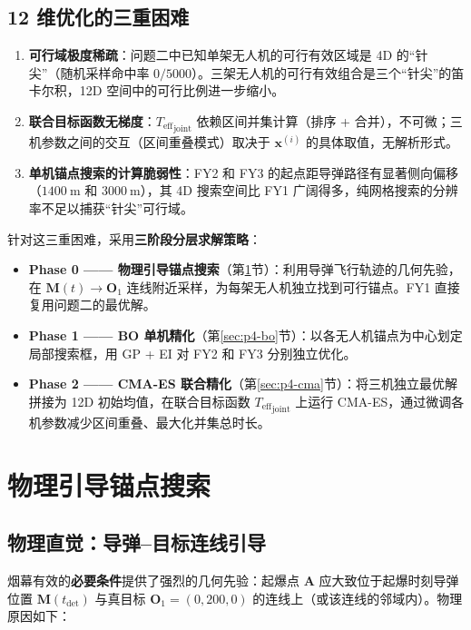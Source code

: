 \documentclass[12pt,a4paper]{ctexart}
\newcommand{\tdet}{t_{\text{det}}}
\newcommand{\Teff}{T_{\text{eff}}}
\begin{document}
\subsection{12 维优化的三重困难}

\begin{enumerate}[label=(\arabic*), leftmargin=*]
    \item \textbf{可行域极度稀疏}：问题二中已知单架无人机的可行有效区域是 4D 的``针尖''（随机采样命中率 $0/5000$）。三架无人机的可行有效组合是三个``针尖''的笛卡尔积，12D 空间中的可行比例进一步缩小。
    \item \textbf{联合目标函数无梯度}：${\Teff}_{\text{joint}}$ 依赖区间并集计算（排序 + 合并），不可微；三机参数之间的交互（区间重叠模式）取决于 $\mathbf{x}^{(i)}$ 的具体取值，无解析形式。
    \item \textbf{单机锚点搜索的计算脆弱性}：FY2 和 FY3 的起点距导弹路径有显著侧向偏移（$1400\ \mathrm{m}$ 和 $3000\ \mathrm{m}$），其 4D 搜索空间比 FY1 广阔得多，纯网格搜索的分辨率不足以捕获``针尖''可行域。
\end{enumerate}

针对这三重困难，采用\textbf{三阶段分层求解策略}：

\begin{itemize}
    \item \textbf{Phase 0 —— 物理引导锚点搜索}（第\ref{sec:p4-anchor}节）：利用导弹飞行轨迹的几何先验，在 $\mathbf{M}(t) \to \mathbf{O}_1$ 连线附近采样，为每架无人机独立找到可行锚点。FY1 直接复用问题二的最优解。
    \item \textbf{Phase 1 —— BO 单机精化}（第\ref{sec:p4-bo}节）：以各无人机锚点为中心划定局部搜索框，用 GP + EI 对 FY2 和 FY3 分别独立优化。
    \item \textbf{Phase 2 —— CMA-ES 联合精化}（第\ref{sec:p4-cma}节）：将三机独立最优解拼接为 12D 初始均值，在联合目标函数 ${\Teff}_{\text{joint}}$ 上运行 CMA-ES，通过微调各机参数减少区间重叠、最大化并集总时长。
\end{itemize}

\section{物理引导锚点搜索}
\label{sec:p4-anchor}

\subsection{物理直觉：导弹--目标连线引导}

烟幕有效的\textbf{必要条件}提供了强烈的几何先验：起爆点 $\mathbf{A}$ 应大致位于起爆时刻导弹位置 $\mathbf{M}(\tdet)$ 与真目标 $\mathbf{O}_1 = (0, 200, 0)$ 的连线上（或该连线的邻域内）。物理原因如下：
\end{document}
